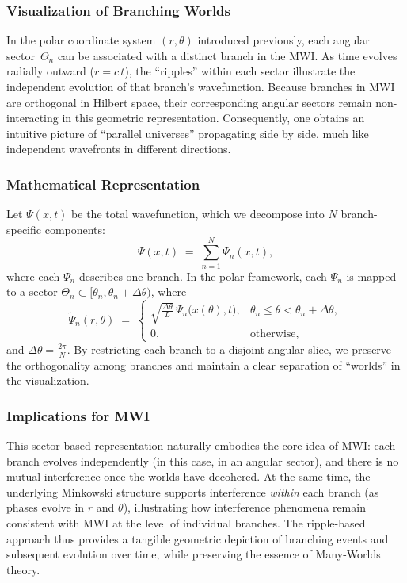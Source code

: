 \documentclass{article}
\begin{document}
\subsubsection{Visualization of Branching Worlds}

In the polar coordinate system \((r,\theta)\) introduced previously, each angular sector~\(\Theta_n\) can be associated with a distinct branch in the MWI. As time evolves radially outward (\(r = c\,t\)), the “ripples” within each sector illustrate the independent evolution of that branch’s wavefunction. Because branches in MWI are orthogonal in Hilbert space, their corresponding angular sectors remain non-interacting in this geometric representation. Consequently, one obtains an intuitive picture of “parallel universes” propagating side by side, much like independent wavefronts in different directions.

\subsubsection{Mathematical Representation}

Let \(\Psi(x,t)\) be the total wavefunction, which we decompose into \(N\) branch-specific components:
\[
\Psi(x,t) \;=\; \sum_{n=1}^{N} \Psi_n(x,t),
\]
where each \(\Psi_n\) describes one branch. In the polar framework, each \(\Psi_n\) is mapped to a sector \(\Theta_n\subset [\theta_n, \theta_n + \Delta\theta)\), where
\[
\tilde{\Psi}_n(r,\theta) \;=\; 
\begin{cases}
\sqrt{\frac{\Delta\theta}{L}}\, \Psi_n\bigl(x(\theta), t\bigr), & \theta_n \le \theta < \theta_n + \Delta\theta,\\
0, & \text{otherwise},
\end{cases}
\]
and \(\Delta\theta = \frac{2\pi}{N}\). By restricting each branch to a disjoint angular slice, we preserve the orthogonality among branches and maintain a clear separation of “worlds” in the visualization.

\subsubsection{Implications for MWI}

This sector-based representation naturally embodies the core idea of MWI: each branch evolves independently (in this case, in an angular sector), and there is no mutual interference once the worlds have decohered. At the same time, the underlying Minkowski structure supports interference \emph{within} each branch (as phases evolve in \(r\) and \(\theta\)), illustrating how interference phenomena remain consistent with MWI at the level of individual branches. The ripple-based approach thus provides a tangible geometric depiction of branching events and subsequent evolution over time, while preserving the essence of Many-Worlds theory.
\end{document}
